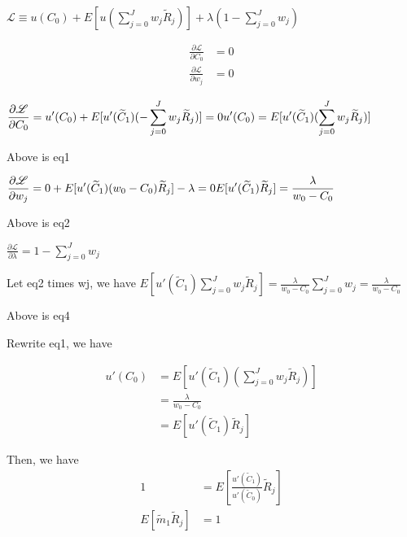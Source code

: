 \documentclass[uplatex,a4paper]{jsarticle}
\begin{document}
$
\displaystyle
\mathscr{L} \equiv u(C_0) + E[u(\sum_{j=0}^{J} w_j \widetilde R_j)] + \lambda ( 1 - \sum_{j=0}^{J} w_j )
$


\begin{align*}
    \frac{\partial \mathscr{L} }{\partial C_0} & =  0 \\
    \frac{\partial \mathscr{L} }{\partial w_j} & =  0
\end{align*}


$
\displaystyle
\frac{\partial \mathscr{L} }{\partial C_0}  =
u'(C_0) + E[u'(\widetilde C_1)(-\sum_{j=0}^{J} w_j \widetilde R_j)]
= 0 \\
u'(C_0) = E[u'(\widetilde C_1)(\sum_{j=0}^{J} w_j \widetilde R_j)]
$

Above is eq1

$
\displaystyle
\frac{\partial \mathscr{L} }{\partial w_j}  =
0 + E[u'(\widetilde C_1)(w_0 - C_0)\widetilde R_j] - \lambda
= 0 \\
E[u'(\widetilde C_1)\widetilde R_j] = \frac{\lambda}{w_0 - C_0}
$

Above is eq2

$
\displaystyle
\frac{\partial \mathscr{L} }{\partial \lambda}  =
1 - \sum_{j=0}^{J} w_j
$

Let eq2 times wj, we have
$
\displaystyle
E[u'(\widetilde C_1) \sum_{j=0}^{J} w_j \widetilde R_j] = \frac{\lambda}{w_0 - C_0} \sum_{j=0}^{J}  w_j= \frac{\lambda}{w_0 - C_0}
$

Above is eq4


Rewrite eq1, we have

\begin{align*}
    u'(C_0)
            &= E[u'(\widetilde C_1)(\sum_{j=0}^{J} w_j \widetilde R_j)] \\
            &= \frac{\lambda}{w_0 - C_0} \\
            &= E[u'(\widetilde C_1)\widetilde R_j]
\end{align*}

Then, we have
\begin{align*}
    1 &= E[ \frac{u'(\widetilde C_1)}{u'(\widetilde C_0)}\widetilde R_j] \\
    E[\widetilde m_1 \widetilde R_j] &=1
\end{align*}
\end{document}
